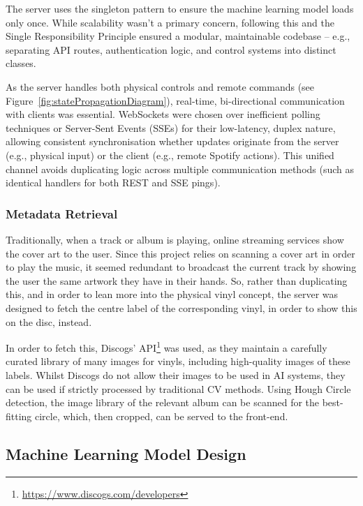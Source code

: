             The server uses the singleton pattern to ensure the machine learning model loads only once. While scalability wasn't a primary concern, following this and the Single Responsibility Principle ensured a modular, maintainable codebase -- e.g., separating API routes, authentication logic, and control systems into distinct classes.
    
            As the server handles both physical controls and remote commands (see Figure~\ref{fig:statePropagationDiagram}), real-time, bi-directional communication with clients was essential. WebSockets were chosen over inefficient polling techniques or Server-Sent Events (SSEs) for their low-latency, duplex nature, allowing consistent synchronisation whether updates originate from the server (e.g., physical input) or the client (e.g., remote Spotify actions). This unified channel avoids duplicating logic across multiple communication methods (such as identical handlers for both REST and SSE pings).
        
            \subsubsection{Metadata Retrieval}
    
                Traditionally, when a track or album is playing, online streaming services show the cover art to the user. Since this project relies on scanning a cover art in order to play the music, it seemed redundant to broadcast the current track by showing the user the same artwork they have in their hands. So, rather than duplicating this, and in order to lean more into the physical vinyl concept, the server was designed to fetch the centre label of the corresponding vinyl, in order to show this on the disc, instead.
    
                In order to fetch this, Discogs' API\footnote{\url{https://www.discogs.com/developers}} was used, as they maintain a carefully curated library of many images for vinyls, including high-quality images of these labels. Whilst Discogs do not allow their images to be used in AI systems, they can be used if strictly processed by traditional CV methods. Using Hough Circle detection, the image library of the relevant album can be scanned for the best-fitting circle, which, then cropped, can be served to the front-end.
          
        \subsection{Machine Learning Model Design} \label{sec:mlDesign}
    
